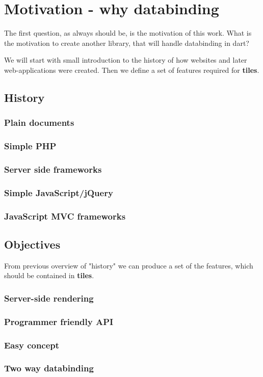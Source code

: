 \chapter{Motivation - why databinding}\label{chap:motivatio}

The first question, as always should be, is the motivation of this work. 
What is the motivation to create another library, that will handle databinding in dart?

We will start with small introduction to the history of how websites and later web-applications were created. 
Then we define a set of features required for \textbf{tiles}.

\section{History}\label{sec:history}
\subsection{Plain documents}\label{subsec:history-plain-doc}
\subsection{Simple PHP}\label{subsec:history-server-side-scripts}
\subsection{Server side frameworks}\label{subsec:history-server-side-frameworks}
\subsection{Simple JavaScript/jQuery}\label{subsec:history-jquery}
\subsection{JavaScript MVC frameworks}\label{subsec:history-js-mvc}


\section{Objectives}\label{sec:objectives}

From previous overview of "history" we can produce a set of the features, 
which should be contained in \textbf{tiles}.

\subsection{Server-side rendering}\label{subsec:objectives-server-side-rendering}
\subsection{Programmer friendly API}\label{subsec:objectives-friendly-api}
\subsection{Easy concept}\label{subsec:objectives-easy-concept}
\subsection{Two way databinding}\label{subsec:objectives-two-way-databinding}
